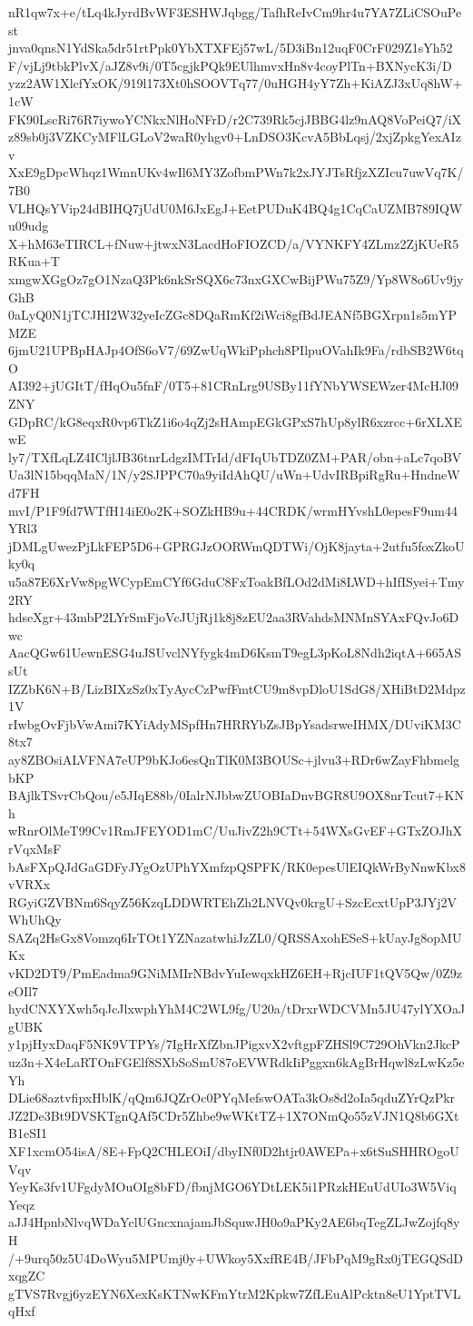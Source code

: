 nR1qw7x+e/tLq4kJyrdBvWF3ESHWJqbgg/TafhReIvCm9hr4u7YA7ZLiCSOuPest
jnva0qnsN1YdSka5dr51rtPpk0YbXTXFEj57wL/5D3iBn12uqF0CrF029Z1sYh52
F/vjLj9tbkPlvX/aJZ8v9i/0T5cgjkPQk9EUlhmvxHn8v4coyPlTn+BXNycK3i/D
yzz2AW1XlcfYxOK/919l173Xt0hSOOVTq77/0uHGH4yY7Zh+KiAZJ3xUq8hW+1cW
FK90LscRi76R7iywoYCNkxNlHoNFrD/r2C739Rk5cjJBBG4lz9nAQ8VoPeiQ7/iX
z89sb0j3VZKCyMFlLGLoV2waR0yhgv0+LnDSO3KcvA5BbLqsj/2xjZpkgYexAIzv
XxE9gDpcWhqz1WmnUKv4wIl6MY3ZofbmPWn7k2xJYJTsRfjzXZIcu7uwVq7K/7B0
VLHQsYVip24dBIHQ7jUdU0M6JxEgJ+EetPUDuK4BQ4g1CqCaUZMB789IQWu09udg
X+hM63eTIRCL+fNuw+jtwxN3LacdHoFIOZCD/a/VYNKFY4ZLmz2ZjKUeR5RKua+T
xmgwXGgOz7gO1NzaQ3Pk6nkSrSQX6c73nxGXCwBijPWu75Z9/Yp8W8o6Uv9jyGhB
0aLyQ0N1jTCJHI2W32yeIcZGc8DQaRmKf2iWci8gfBdJEANf5BGXrpn1s5mYPMZE
6jmU21UPBpHAJp4OfS6oV7/69ZwUqWkiPphch8PIlpuOVahIk9Fa/rdbSB2W6tqO
AI392+jUGItT/fHqOu5fnF/0T5+81CRnLrg9USBy11fYNbYWSEWzer4McHJ09ZNY
GDpRC/kG8eqxR0vp6TkZ1i6o4qZj2sHAmpEGkGPxS7hUp8ylR6xzrcc+6rXLXEwE
ly7/TXfLqLZ4ICljlJB36tnrLdgzIMTrId/dFIqUbTDZ0ZM+PAR/obn+aLc7qoBV
Ua3lN15bqqMaN/1N/y2SJPPC70a9yiIdAhQU/uWn+UdvIRBpiRgRu+HndneWd7FH
mvI/P1F9fd7WTfH14iE0o2K+SOZkHB9u+44CRDK/wrmHYvshL0epesF9um44YRl3
jDMLgUwezPjLkFEP5D6+GPRGJzOORWmQDTWi/OjK8jayta+2utfu5foxZkoUky0q
u5a87E6XrVw8pgWCypEmCYf6GduC8FxToakBfLOd2dMi8LWD+hIfISyei+Tmy2RY
hdseXgr+43mbP2LYrSmFjoVcJUjRj1k8j8zEU2aa3RVahdsMNMnSYAxFQvJo6Dwc
AacQGw61UewnESG4uJSUvclNYfygk4mD6KsmT9egL3pKoL8Ndh2iqtA+665ASsUt
IZZbK6N+B/LizBIXzSz0xTyAycCzPwfFmtCU9m8vpDloU1SdG8/XHiBtD2Mdpz1V
rIwbgOvFjbVwAmi7KYiAdyMSpfHn7HRRYbZsJBpYsadsrweIHMX/DUviKM3C8tx7
ay8ZBOsiALVFNA7eUP9bKJo6esQnTlK0M3BOUSc+jlvu3+RDr6wZayFhbmelgbKP
BAjlkTSvrCbQou/e5JIqE88b/0IalrNJbbwZUOBIaDnvBGR8U9OX8nrTcut7+KNh
wRnrOlMeT99Cv1RmJFEYOD1mC/UuJivZ2h9CTt+54WXsGvEF+GTxZOJhXrVqxMsF
bAsFXpQJdGaGDFyJYgOzUPhYXmfzpQSPFK/RK0epesUlEIQkWrByNnwKbx8vVRXx
RGyiGZVBNm6SqyZ56KzqLDDWRTEhZh2LNVQv0krgU+SzcEcxtUpP3JYj2VWhUhQy
SAZq2HsGx8Vomzq6IrTOt1YZNazatwhiJzZL0/QRSSAxohESeS+kUayJg8opMUKx
vKD2DT9/PmEadma9GNiMMIrNBdvYuIewqxkHZ6EH+RjcIUF1tQV5Qw/0Z9zeOIl7
hydCNXYXwh5qJcJlxwphYhM4C2WL9fg/U20a/tDrxrWDCVMn5JU47ylYXOaJgUBK
y1pjHyxDaqF5NK9VTPYs/7IgHrXfZbnJPigxvX2vftgpFZHSl9C729OhVkn2JkcP
uz3n+X4eLaRTOnFGElf8SXbSoSmU87oEVWRdkIiPggxn6kAgBrHqwl8zLwKz5eYh
DLie68aztvfipxHblK/qQm6JQZrOc0PYqMefswOATa3kOs8d2oIa5qduZYrQzPkr
JZ2De3Bt9DVSKTgnQAf5CDr5Zhbe9wWKtTZ+1X7ONmQo55zVJN1Q8b6GXtB1eSI1
XF1xcmO54isA/8E+FpQ2CHLEOiI/dbyINf0D2htjr0AWEPa+x6tSuSHHROgoUVqv
YeyKs3fv1UFgdyMOuOIg8bFD/fbnjMGO6YDtLEK5i1PRzkHEuUdUIo3W5ViqYeqz
aJJ4HpnbNlvqWDaYclUGncxnajamJbSquwJH0o9aPKy2AE6bqTegZLJwZojfq8yH
/+9urq50z5U4DoWyu5MPUmj0y+UWkoy5XxfRE4B/JFbPqM9gRx0jTEGQSdDxqgZC
gTVS7Rvgj6yzEYN6XexKsKTNwKFmYtrM2Kpkw7ZfLEuAlPcktn8eU1YptTVLqHxf

